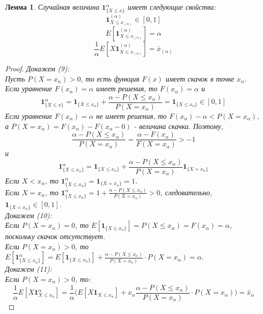 \documentclass[18pt,a4paper]{article}
\theoremstyle{plain}
\newtheorem{Lemma}{Лемма}[section]
\theoremstyle{definition}
\begin{document}
\begin{Lemma}
Случайная величина $\mathbf{1}^\alpha_{\{X \le x\}}$ имеет следующие свойства:
\begin{equation}
\mathbf{1}^{(\alpha)}_{X\le x_{(\alpha)}} \in [0,1]
\end{equation}
\begin{equation}
E[\mathbf{1}^{(\alpha)}_{X\le x_{(\alpha)}} ] = \alpha
\end{equation}
\begin{equation}
\frac{1}{\alpha}E[X\mathbf{1}^{(\alpha)}_{X\le x_{(\alpha)}} ] = \bar{x}_{(\alpha)}
\end{equation}
\end{Lemma}

\begin{proof}
\hspace{20pt} \it Докажем (9):\rm\\
Пусть $P(X=x_\alpha)>0$, то есть функция $F(x)$ имеет скачок в точке $x_\alpha$.\\
Если уравнение $F(x_\alpha)=\alpha$ имеет решения, то $F(x_\alpha)=\alpha$ и
$$
\mathbf{1}^\alpha_{\{X \le x\}} = \mathbf{1}_{\{X \le x_\alpha\}}+\frac{\alpha-P(X \le x_\alpha)}{P(X=x_\alpha)}=\mathbf{1}_{\{X \le x_\alpha\}} \in [0,1]
$$
Если уравнение $F(x_\alpha)=\alpha$ не имеет решения, то $F(x_\alpha)-\alpha < P(X=x_\alpha)$, а $P(X=x_\alpha)=F(x_\alpha)-F(x_\alpha-0)$ - величина скачка. Поэтому, \\
$$
\frac{\alpha-P(X \le x_\alpha)}{P(X=x_\alpha)} = \frac{\alpha-F(x_\alpha)}{F(X=x_\alpha)} > -1
$$
и
$$
\mathbf{1}^\alpha_{\{X \le x_\alpha\}}=\mathbf{1}_{\{X \le x_\alpha\}}+\frac{\alpha-P(X \le x_\alpha)}{P(X=x_\alpha)}\mathbf{1}_{\{X = x_\alpha\}}
$$
Если $X<x_\alpha$, то $\mathbf{1}^\alpha_{\{X \le x_\alpha\}}=\mathbf{1}_{\{X = x_\alpha\}} = 1$.\\
Если $X=x_\alpha$, то $\mathbf{1}^\alpha_{\{X \le x_\alpha\}} = 1 + \frac{\alpha-P(X\le x_\alpha)}{P(X=x_\alpha)} >0$, следовательно, $\mathbf{1}_{\{X = x_\alpha\}} \in [0,1]$.\\
\hspace{20pt} \it Докажем (10):\rm\\
Если $P(X=x_\alpha)=0$, то $E[\mathbf{1}_{\{X\le x_{\alpha}\}} ] =P(X \le x_\alpha) = F(x_\alpha)=\alpha$, поскольку скачок отсутствует.\\
Если $P(X=x_\alpha)>0$, то $E[\mathbf{1}^\alpha_{\{X\le x_{\alpha}\}} ] = E[\mathbf{1}_{\{X\le x_{\alpha}\}} ] + \frac{\alpha-P(X \le x_\alpha)}{P(X=x_\alpha)} \cdot P(X=x_\alpha) = \alpha$.\\
\hspace{20pt} \it Докажем (11):\rm\\
Если $P(X=x_\alpha)>0$, то:\\
$$
\frac{1}{\alpha}E[X\mathbf{1}^\alpha_{X\le x_{\alpha}} ] = \frac{1}{\alpha} \Big( E[X\mathbf{1}_{X\le x_{\alpha}} ] +
x_\alpha \frac{\alpha-P(X \le x_\alpha)}{P(X=x_\alpha)}\cdot P(X=x_\alpha)\Big) =\bar{x}_{\alpha}
$$


\end{proof}
\end{document}

